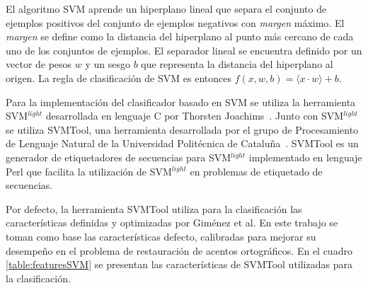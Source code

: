\documentclass[runningheads,a4paper]{llncs}
\begin{document}
El algoritmo SVM aprende un hiperplano lineal que separa el conjunto de ejemplos positivos del conjunto de ejemplos negativos con \emph{margen} máximo. El \emph{margen} se define como la distancia del hiperplano al punto más cercano de cada uno de los conjuntos de ejemplos. El separador lineal se encuentra definido por un vector de pesos $w$ y un sesgo $b$ que representa la distancia del hiperplano al origen. La regla de clasificación de SVM es entonces $f(x,w,b)=\langle x \cdot w \rangle+b$.

Para la implementaci\'on del clasificador basado en SVM se utiliza la herramienta SVM$^{light}$ desarrollada en lenguaje C por Thorsten Joachims~\cite{JOACHIMS99,JOACHIMS08}. Junto con SVM$^{light}$ se utiliza SVMTool, una herramienta desarrollada por el grupo de Procesamiento de Lenguaje Natural de la Universidad Politécnica de Cataluña~\cite{GIMENEZ04,GIMENEZ06}. SVMTool es un generador de etiquetadores de secuencias para SVM$^{light}$ implementado en lenguaje Perl que facilita la utilizaci\'on de SVM$^{light}$ en problemas de etiquetado de secuencias. 

Por defecto, la herramienta SVMTool utiliza para la clasificación las características definidas y optimizadas por Giménez et al. En este trabajo se toman como base las caracter\'isticas defecto, calibradas para mejorar su desempeño en el problema de restauración de acentos ortográficos. En el cuadro \ref{table:featuresSVM} se presentan las características de SVMTool utilizadas para la clasificación.
\end{document}
